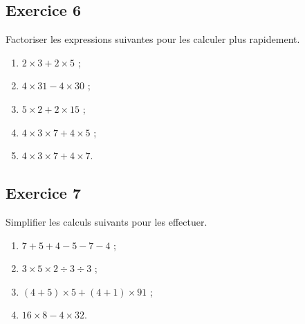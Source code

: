 \documentclass[12 pt]{extarticle}
\theoremstyle{plain}
\begin{document}
\subsection*{Exercice 6}

Factoriser les expressions suivantes pour les calculer plus rapidement. \begin{enumerate}
\item $ 2 \times 3 + 2 \times 5$ ;
\item $ 4 \times 31 - 4 \times 30 $ ;
\item $ 5 \times 2 + 2 \times 15$ ;
\item $ 4 \times 3 \times 7 + 4 \times 5$ ;
\item $ 4 \times 3 \times 7 + 4 \times 7$.
\end{enumerate}

\subsection*{Exercice 7}

Simplifier les calculs suivants pour les effectuer.

\begin{enumerate}
\item $ 7 + 5 + 4 - 5 - 7 - 4$ ; 
\item $ 3 \times 5 \times 2 \div 3 \div 3$ ;
\item $ (4 + 5) \times 5 + (4+1) \times 91$ ;
\item $ 16 \times 8 - 4 \times 32$.

\end{enumerate}


 	
\end{document}
